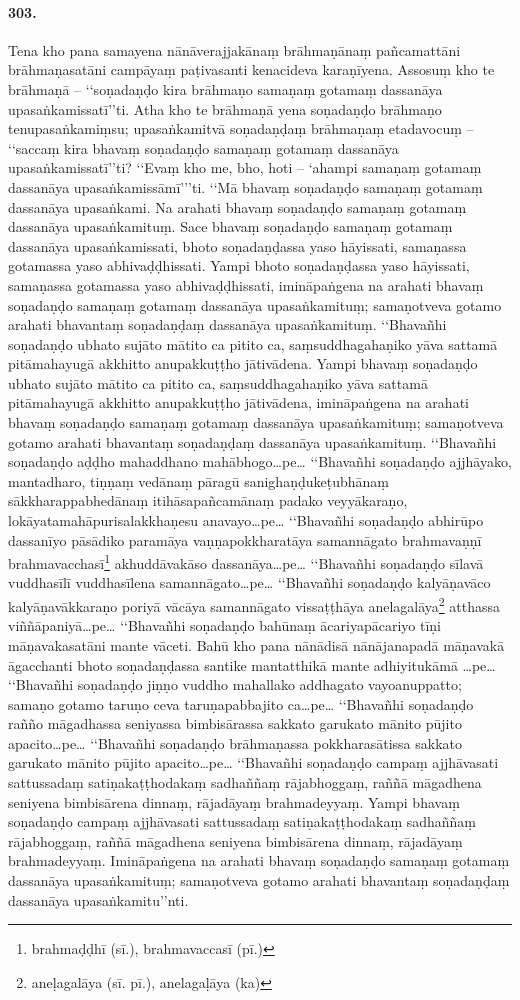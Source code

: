 \paragraph{303.} Tena kho pana samayena nānāverajjakānaṃ brāhmaṇānaṃ pañcamattāni brāhmaṇasatāni campāyaṃ paṭivasanti kenacideva karaṇīyena. Assosuṃ kho te brāhmaṇā – ‘‘soṇadaṇḍo kira brāhmaṇo samaṇaṃ gotamaṃ dassanāya upasaṅkamissatī’’ti. Atha kho te brāhmaṇā yena soṇadaṇḍo brāhmaṇo tenupasaṅkamiṃsu; upasaṅkamitvā soṇadaṇḍaṃ brāhmaṇaṃ etadavocuṃ – ‘‘saccaṃ kira bhavaṃ soṇadaṇḍo samaṇaṃ gotamaṃ dassanāya upasaṅkamissatī’’ti? ‘‘Evaṃ kho me, bho, hoti – ‘ahampi samaṇaṃ gotamaṃ dassanāya upasaṅkamissāmī’’’ti. ‘‘Mā bhavaṃ soṇadaṇḍo samaṇaṃ gotamaṃ dassanāya upasaṅkami. Na arahati bhavaṃ soṇadaṇḍo samaṇaṃ gotamaṃ dassanāya upasaṅkamituṃ. Sace bhavaṃ soṇadaṇḍo samaṇaṃ gotamaṃ dassanāya upasaṅkamissati, bhoto soṇadaṇḍassa yaso hāyissati, samaṇassa gotamassa yaso abhivaḍḍhissati. Yampi bhoto soṇadaṇḍassa yaso hāyissati, samaṇassa gotamassa yaso abhivaḍḍhissati, imināpaṅgena na arahati bhavaṃ soṇadaṇḍo samaṇaṃ gotamaṃ dassanāya upasaṅkamituṃ; samaṇotveva gotamo arahati bhavantaṃ soṇadaṇḍaṃ dassanāya upasaṅkamituṃ. ‘‘Bhavañhi soṇadaṇḍo ubhato sujāto mātito ca pitito ca, saṃsuddhagahaṇiko yāva sattamā pitāmahayugā akkhitto anupakkuṭṭho jātivādena. Yampi bhavaṃ soṇadaṇḍo ubhato sujāto mātito ca pitito ca, saṃsuddhagahaṇiko yāva sattamā pitāmahayugā akkhitto anupakkuṭṭho jātivādena, imināpaṅgena na arahati bhavaṃ soṇadaṇḍo samaṇaṃ gotamaṃ dassanāya upasaṅkamituṃ; samaṇotveva gotamo arahati bhavantaṃ soṇadaṇḍaṃ dassanāya upasaṅkamituṃ. ‘‘Bhavañhi soṇadaṇḍo aḍḍho mahaddhano mahābhogo…pe… ‘‘Bhavañhi soṇadaṇḍo ajjhāyako, mantadharo, tiṇṇaṃ vedānaṃ pāragū sanighaṇḍukeṭubhānaṃ sākkharappabhedānaṃ itihāsapañcamānaṃ padako veyyākaraṇo, lokāyatamahāpurisalakkhaṇesu anavayo…pe… ‘‘Bhavañhi soṇadaṇḍo abhirūpo dassanīyo pāsādiko paramāya vaṇṇapokkharatāya samannāgato brahmavaṇṇī brahmavacchasī\footnote{brahmaḍḍhī (sī.), brahmavaccasī (pī.)} akhuddāvakāso dassanāya…pe… ‘‘Bhavañhi soṇadaṇḍo sīlavā vuddhasīlī vuddhasīlena samannāgato…pe… ‘‘Bhavañhi soṇadaṇḍo kalyāṇavāco kalyāṇavākkaraṇo poriyā vācāya samannāgato vissaṭṭhāya anelagalāya\footnote{aneḷagalāya (sī. pī.), anelagaḷāya (ka)} atthassa viññāpaniyā…pe… ‘‘Bhavañhi soṇadaṇḍo bahūnaṃ ācariyapācariyo tīṇi māṇavakasatāni mante vāceti. Bahū kho pana nānādisā nānājanapadā māṇavakā āgacchanti bhoto soṇadaṇḍassa santike mantatthikā mante adhiyitukāmā …pe… ‘‘Bhavañhi soṇadaṇḍo jiṇṇo vuddho mahallako addhagato vayoanuppatto; samaṇo gotamo taruṇo ceva taruṇapabbajito ca…pe… ‘‘Bhavañhi soṇadaṇḍo rañño māgadhassa seniyassa bimbisārassa sakkato garukato mānito pūjito apacito…pe… ‘‘Bhavañhi soṇadaṇḍo brāhmaṇassa pokkharasātissa sakkato garukato mānito pūjito apacito…pe… ‘‘Bhavañhi soṇadaṇḍo campaṃ ajjhāvasati sattussadaṃ satiṇakaṭṭhodakaṃ sadhaññaṃ rājabhoggaṃ, raññā māgadhena seniyena bimbisārena dinnaṃ, rājadāyaṃ brahmadeyyaṃ. Yampi bhavaṃ soṇadaṇḍo campaṃ ajjhāvasati sattussadaṃ satiṇakaṭṭhodakaṃ sadhaññaṃ rājabhoggaṃ, raññā māgadhena seniyena bimbisārena dinnaṃ, rājadāyaṃ brahmadeyyaṃ. Imināpaṅgena na arahati bhavaṃ soṇadaṇḍo samaṇaṃ gotamaṃ dassanāya upasaṅkamituṃ; samaṇotveva gotamo arahati bhavantaṃ soṇadaṇḍaṃ dassanāya upasaṅkamitu’’nti.

